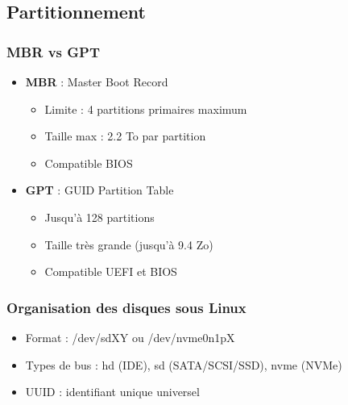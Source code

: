 \documentclass[12pt,a4paper]{article}
\begin{document}
\subsection{Partitionnement}


\subsubsection{MBR vs GPT}
\begin{itemize}
    \item \textbf{MBR} : Master Boot Record
    \begin{itemize}
        \item Limite : 4 partitions primaires maximum %
        \item Taille max : 2.2 To par partition %
        \item Compatible BIOS %
    \end{itemize}
    \item \textbf{GPT} : GUID Partition Table
    \begin{itemize}
        \item Jusqu'\`a 128 partitions %
        \item Taille tr\`es grande (jusqu'\`a 9.4 Zo) %
        \item Compatible UEFI et BIOS %
    \end{itemize}
\end{itemize}

\subsubsection{Organisation des disques sous Linux}
\begin{itemize}
    \item Format : /dev/sdXY ou /dev/nvme0n1pX
    \item Types de bus : hd (IDE), sd (SATA/SCSI/SSD), nvme (NVMe)
    \item UUID : identifiant unique universel
\end{itemize}
\end{document}

